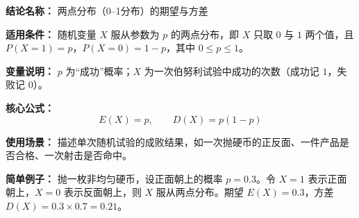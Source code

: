 \textbf{结论名称：} 两点分布（0--1分布）的期望与方差

\textbf{适用条件：} 随机变量 \(X\) 服从参数为 \(p\) 的两点分布，即 \(X\) 只取 \(0\) 与 \(1\) 两个值，且 \(P(X=1)=p\)，\(P(X=0)=1-p\)，其中 \(0 \le p \le 1\)。

\textbf{变量说明：} \(p\) 为“成功”概率；\(X\) 为一次伯努利试验中成功的次数（成功记 \(1\)，失败记 \(0\)）。

\textbf{核心公式：} 
\[
\boxed{E(X)=p,\qquad D(X)=p(1-p)}
\]

\textbf{使用场景：} 描述单次随机试验的成败结果，如一次抛硬币的正反面、一件产品是否合格、一次射击是否命中。

\textbf{简单例子：} 抛一枚非均匀硬币，设正面朝上的概率 \(p=0.3\)。令 \(X=1\) 表示正面朝上，\(X=0\) 表示反面朝上，则 \(X\) 服从两点分布。期望 \(E(X)=0.3\)，方差 \(D(X)=0.3\times 0.7=0.21\)。
